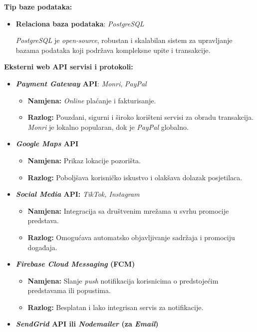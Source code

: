 \textbf{Tip baze podataka:}
\begin{itemize}  
    \item \textbf{Relaciona baza podataka}: \textit{PostgreSQL}

    
    \textit{PostgreSQL} je \textit{open-source}, robustan i skalabilan sistem za upravljanje bazama podataka koji podržava kompleksne upite i transakcije. 
    
\end{itemize} 
\textbf{Eksterni web API servisi i protokoli:}
\begin{itemize}  
    \item \textbf{\textit{Payment Gateway} API}: \textit{Monri}, \textit{PayPal}\begin{itemize}
        \item \textbf{Namjena:} \textit{Online} plaćanje i fakturisanje.
        \item \textbf{Razlog:} Pouzdani, sigurni i široko korišteni servisi za obradu transakcija. \textit{Monri} je lokalno popularan, dok je \textit{PayPal} globalno.
    \end{itemize}
    \item \textbf{\textit{Google Maps} API} \begin{itemize}
        \item \textbf{Namjena:} Prikaz lokacije pozorišta.
        \item \textbf{Razlog:} Poboljšava korisničko iskustvo i olakšava dolazak posjetilaca.
    \end{itemize}
    \item \textbf{\textit{Social Media} API:} \textit{TikTok, Instagram} \begin{itemize}
        \item \textbf{Namjena:} Integracija sa društvenim mrežama u svrhu promocije predstava.
        \item \textbf{Razlog:} Omogućava automatsko objavljivanje sadržaja i promociju događaja.
    \end{itemize}
    \item \textbf{\textit{Firebase Cloud Messaging} (FCM)}\begin{itemize}
        \item \textbf{Namjena:} Slanje \textit{push} notifikacija korisnicima o predstojećim predstavama ili popustima.
        \item \textbf{Razlog:} Besplatan i lako integrisan servis za notifikacije.
    \end{itemize}
    \item \textbf{\textit{SendGrid }API ili \textit{Nodemailer} (za \textit{Email})} \begin{itemize}

\end{itemize}
\end{itemize}
